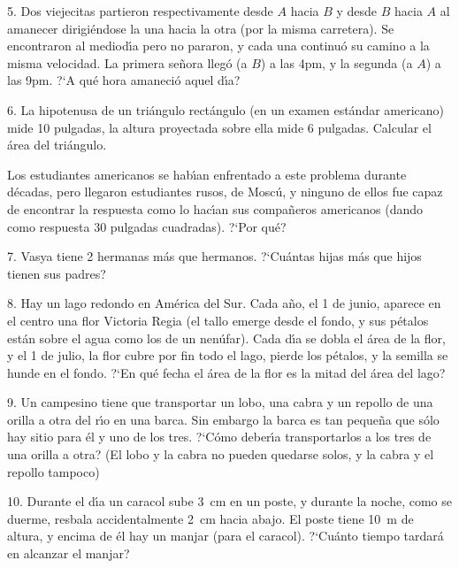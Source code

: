 \begin{problem}{5.}
	Dos viejecitas partieron respectivamente desde $A$ hacia $B$ y desde $B$ hacia $A$ al amanecer dirigi\'endose la
	una hacia la otra (por la misma carretera). Se encontraron al mediod\'{\i}a pero no pararon, y cada una continu\'o su
	camino a la misma velocidad. La primera se\~nora lleg\'o (a $B$) a las 4pm, y la segunda (a $A$) a las 9pm. ?`A qu\'e hora amaneci\'o aquel d\'{\i}a?
\end{problem}

\begin{problem}{6.}
	La hipotenusa de un tri\'angulo rect\'angulo (en un examen est\'andar americano) mide 10 pulgadas,
	la altura proyectada sobre ella mide 6 pulgadas. Calcular el \'area del tri\'angulo.

	Los estudiantes americanos se hab\'{\i}an enfrentado a este problema durante d\'ecadas, pero llegaron estudiantes rusos,
	de Mosc\'u, y ninguno de ellos fue capaz de encontrar la respuesta como lo hac\'{\i}an sus compa\~neros americanos
	(dando como respuesta 30 pulgadas cuadradas). ?`Por qu\'e?
\end{problem}

\begin{problem}{7.}
	Vasya tiene 2 hermanas m\'as que hermanos. ?`Cu\'antas hijas m\'as que hijos tienen sus padres?
\end{problem}

\begin{problem}{8.}
	Hay un lago redondo en Am\'erica del Sur. Cada a\~no, el 1 de junio, aparece en el centro una flor Victoria Regia
	(el tallo emerge desde el fondo, y sus p\'etalos est\'an sobre el agua como los de un nen\'ufar). Cada d\'{\i}a se dobla
	el \'area de la flor, y el 1 de julio, la flor cubre por fin todo el lago, pierde los p\'etalos, y la semilla se hunde
	en el fondo. ?`En qu\'e fecha el \'area de la flor es la mitad del \'area del lago?
\end{problem}

\begin{problem}{9.}
	Un campesino tiene que transportar un lobo, una cabra y un repollo de una orilla a otra del r\'{\i}o en una barca.
	Sin embargo la barca es tan peque\~na que s\'olo hay sitio para \'el y uno de los tres. ?`C\'omo deber\'{\i}a
	transportarlos a los tres de una orilla a otra? (El lobo y la cabra no pueden quedarse solos, y la cabra y el repollo
	tampoco)
\end{problem}

\begin{problem}{10.}
	Durante el d\'{\i}a un caracol sube \SI{3}{\cm} en un poste, y durante la noche, como se duerme, resbala
	accidentalmente \SI{2}{\cm} hacia abajo. El poste tiene \SI{10}{\metre} de altura, y encima de \'el hay un manjar (para el caracol).
	?`Cu\'anto tiempo tardar\'a en alcanzar el manjar?
\end{problem}

